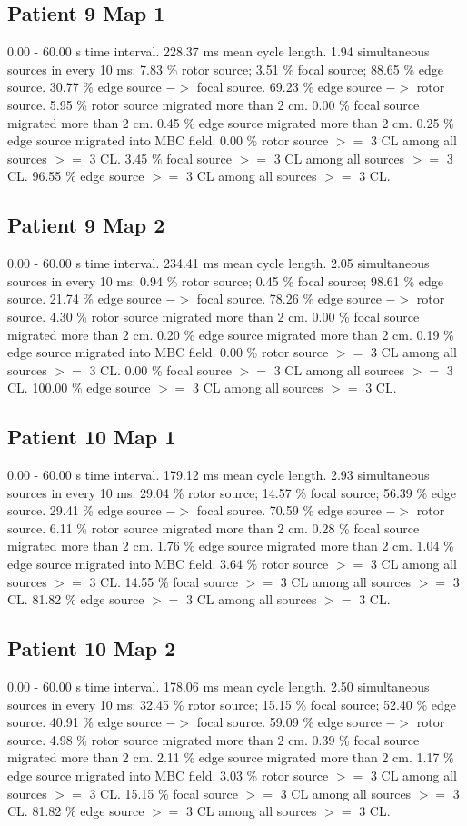 \documentclass[journal,onecolumn]{IEEEtran} %
\begin{document}
\subsection{Patient 9 Map 1}
0.00 - 60.00 s time interval.
228.37 ms mean cycle length.
1.94 simultaneous sources in every 10 ms:
7.83 \% rotor source;
3.51 \% focal source;
88.65 \% edge source.
30.77 \% edge source $->$ focal source.
69.23 \% edge source $->$ rotor source.
5.95 \% rotor source migrated more than 2 cm.
0.00 \% focal source migrated more than 2 cm.
0.45 \% edge source migrated more than 2 cm.
0.25 \% edge source migrated into MBC field.
0.00 \% rotor source $>=$ 3 CL among all sources $>=$ 3 CL.
3.45 \% focal source $>=$ 3 CL among all sources $>=$ 3 CL.
96.55 \% edge source $>=$ 3 CL among all sources $>=$ 3 CL.

\subsection{Patient 9 Map 2}
0.00 - 60.00 s time interval.
234.41 ms mean cycle length.
2.05 simultaneous sources in every 10 ms:
0.94 \% rotor source;
0.45 \% focal source;
98.61 \% edge source.
21.74 \% edge source $->$ focal source.
78.26 \% edge source $->$ rotor source.
4.30 \% rotor source migrated more than 2 cm.
0.00 \% focal source migrated more than 2 cm.
0.20 \% edge source migrated more than 2 cm.
0.19 \% edge source migrated into MBC field.
0.00 \% rotor source $>=$ 3 CL among all sources $>=$ 3 CL.
0.00 \% focal source $>=$ 3 CL among all sources $>=$ 3 CL.
100.00 \% edge source $>=$ 3 CL among all sources $>=$ 3 CL.

\subsection{Patient 10 Map 1}
0.00 - 60.00 s time interval.
179.12 ms mean cycle length.
2.93 simultaneous sources in every 10 ms:
29.04 \% rotor source;
14.57 \% focal source;
56.39 \% edge source.
29.41 \% edge source $->$ focal source.
70.59 \% edge source $->$ rotor source.
6.11 \% rotor source migrated more than 2 cm.
0.28 \% focal source migrated more than 2 cm.
1.76 \% edge source migrated more than 2 cm.
1.04 \% edge source migrated into MBC field.
3.64 \% rotor source $>=$ 3 CL among all sources $>=$ 3 CL.
14.55 \% focal source $>=$ 3 CL among all sources $>=$ 3 CL.
81.82 \% edge source $>=$ 3 CL among all sources $>=$ 3 CL.

\subsection{Patient 10 Map 2}
0.00 - 60.00 s time interval.
178.06 ms mean cycle length.
2.50 simultaneous sources in every 10 ms:
32.45 \% rotor source;
15.15 \% focal source;
52.40 \% edge source.
40.91 \% edge source $->$ focal source.
59.09 \% edge source $->$ rotor source.
4.98 \% rotor source migrated more than 2 cm.
0.39 \% focal source migrated more than 2 cm.
2.11 \% edge source migrated more than 2 cm.
1.17 \% edge source migrated into MBC field.
3.03 \% rotor source $>=$ 3 CL among all sources $>=$ 3 CL.
15.15 \% focal source $>=$ 3 CL among all sources $>=$ 3 CL.
81.82 \% edge source $>=$ 3 CL among all sources $>=$ 3 CL.


% 
% 
\end{document}
